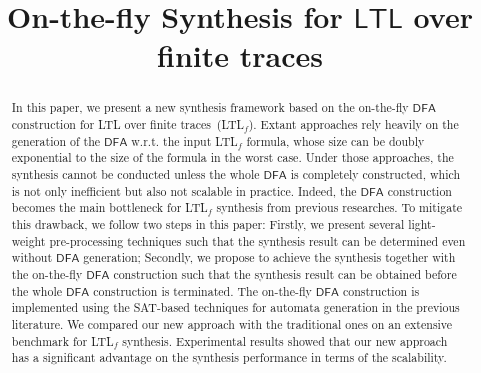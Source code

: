 \documentclass[letterpaper]{article} %
\newcommand{\ltlf}{\textsf{LTL}$_f$\xspace}
\newcommand{\ltl}{\textsf{LTL}\xspace}
\def\dfa{$\mathsf{DFA}$\xspace}
\def\SAT{\textsf{SAT}\xspace}
\begin{document}
%

\title{On-the-fly Synthesis for $\ltl$ over finite traces}



\iffalse
\author{Jianwen Li, Kristin Y. Rozier\\ Iowa State University\\ Ames, IA, USA\\\{jianwen,kyrozier\}@iastate.edu 
\And Geguang Pu, Yueling Zhang\\ East China Normal University\\ Shanghai, China\\\{ggpu,ylzhang\}@sei.ecnu.edu.cn
\And Moshe Y. Vardi\\ Rice University\\ Houston, TX, USA\\ vardi@cs.rice.edu}
\fi

\maketitle
 


\begin{abstract}
In this paper, we present a new synthesis framework based on the on-the-fly \dfa construction for \ltl over finite traces~(\ltlf). Extant approaches rely heavily on the generation of the \dfa w.r.t. the input \ltlf formula, whose size can be doubly exponential to the size of the formula in the worst case. Under those approaches, the synthesis cannot be conducted unless the whole \dfa is completely constructed, which is not only inefficient but also not scalable in practice. Indeed, the \dfa construction becomes the main bottleneck for \ltlf synthesis from previous researches. To mitigate this drawback, we follow two steps in this paper: Firstly, we present several light-weight pre-processing techniques such that the synthesis result can be determined even without \dfa generation; Secondly, we propose to achieve the synthesis together with the on-the-fly \dfa construction such that the synthesis result can be obtained before the whole \dfa construction is terminated. The on-the-fly \dfa construction is implemented using the \SAT-based techniques for automata generation in the previous literature. We compared our new approach with the traditional ones on an extensive benchmark for \ltlf synthesis. Experimental results showed that our new approach has a significant advantage on the synthesis performance in terms of the scalability. 
\end{abstract}










%

%



%

\newpage


\end{document}
